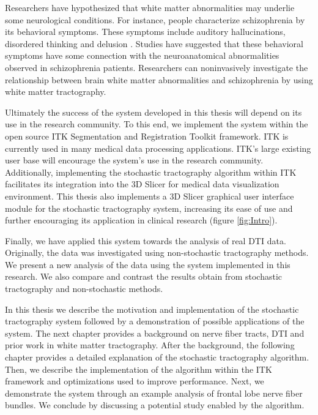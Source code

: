 Researchers have hypothesized that white matter abnormalities may underlie some neurological conditions.  For instance, people characterize schizophrenia by its behavioral symptoms.  These symptoms include auditory hallucinations, disordered thinking and delusion \cite{kubickiNYAS05}.  Studies have suggested that these behavioral symptoms have some connection with the neuroanatomical abnormalities observed in schizophrenia patients\cite{kubickiNYAS05}.  Researchers can noninvasively investigate the relationship between brain white matter abnormalities and schizophrenia by using white matter tractography.

Ultimately the success of the system developed in this thesis will depend on its use in the research community.  To this end, we implement the system within the open source ITK Segmentation and Registration Toolkit \cite{itk} framework.  ITK is currently used in many medical data processing applications.  ITK's large existing user base will encourage the system's use in the research community.  Additionally, implementing the stochastic tractography algorithm within ITK facilitates its integration into the 3D Slicer \cite{3Dslicer} for medical data visualization environment.  This thesis also implements a 3D Slicer graphical user interface module for the stochastic tractography system, increasing its ease of use and further encouraging its application in clinical research (figure \ref{fig:Intro}).

Finally, we have applied this system towards the analysis of real DTI data.  Originally, the data was investigated using non-stochastic tractography methods.  We present a new analysis of the data using the system implemented in this research.  We also compare and contrast the results obtain from stochastic tractography and non-stochastic methods.

In this thesis we describe the motivation and implementation of the stochastic tractography system followed by a demonstration of possible applications of the system.  The next chapter  provides a background on nerve fiber tracts, DTI and prior work in white matter tractography.  After the background, the following chapter provides a detailed explanation of the stochastic tractography algorithm.  Then, we describe the implementation of the algorithm within the ITK framework and optimizations used to improve performance.  Next, we demonstrate the system through an example analysis of frontal lobe nerve fiber bundles.  We conclude by discussing a potential study enabled by the algorithm.
